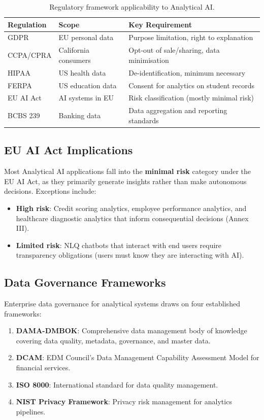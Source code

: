 \documentclass[12pt, a4paper]{article}
\begin{document}
\begin{table}[ht]
\centering
\caption{Regulatory framework applicability to Analytical AI.}
\label{tab:regulation}
\begin{tabular}{lll}
\toprule
\textbf{Regulation} & \textbf{Scope} & \textbf{Key Requirement} \\
\midrule
GDPR             & EU personal data       & Purpose limitation, right to explanation \\
CCPA/CPRA        & California consumers   & Opt-out of sale/sharing, data minimisation \\
HIPAA            & US health data         & De-identification, minimum necessary \\
FERPA            & US education data      & Consent for analytics on student records \\
EU AI Act        & AI systems in EU       & Risk classification (mostly minimal risk) \\
BCBS 239         & Banking data           & Data aggregation and reporting standards \\
\bottomrule
\end{tabular}
\end{table}

\subsection{EU AI Act Implications}
Most Analytical AI applications fall into the \textbf{minimal risk} category under the EU AI Act, as they primarily generate insights rather than make autonomous decisions. Exceptions include:
\begin{itemize}
    \item \textbf{High risk}: Credit scoring analytics, employee performance analytics, and healthcare diagnostic analytics that inform consequential decisions (Annex III).
    \item \textbf{Limited risk}: NLQ chatbots that interact with end users require transparency obligations (users must know they are interacting with AI).
\end{itemize}

\subsection{Data Governance Frameworks}
Enterprise data governance for analytical systems draws on four established frameworks:

\begin{enumerate}
    \item \textbf{DAMA-DMBOK}: Comprehensive data management body of knowledge covering data quality, metadata, governance, and master data.
    \item \textbf{DCAM}: EDM Council's Data Management Capability Assessment Model for financial services.
    \item \textbf{ISO 8000}: International standard for data quality management.
    \item \textbf{NIST Privacy Framework}: Privacy risk management for analytics pipelines.
\end{enumerate}
\end{document}
